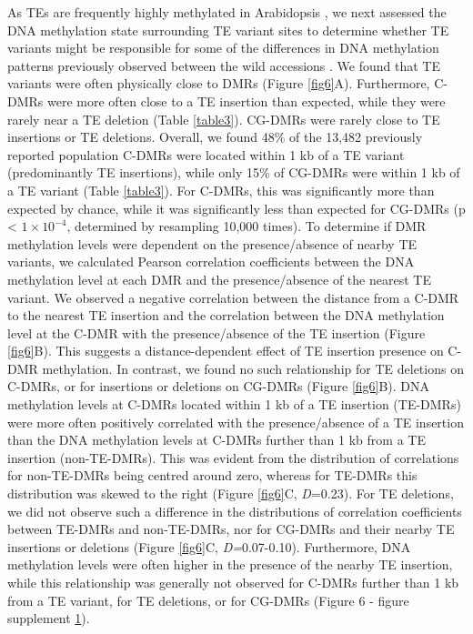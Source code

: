 \documentclass[12pt]{article}
\begin{document}
As TEs are frequently highly methylated in Arabidopsis
\cite{Lister:2008bh, Cokus:2008fc, Zhang:2006eo, Zilberman:2006hx}, we
next assessed the DNA methylation state surrounding TE variant sites to
determine whether TE variants might be responsible for some of the
differences in DNA methylation patterns previously observed between the
wild accessions \cite{Schmitz:2013iu}. We found that TE variants were
often physically close to DMRs (Figure \ref{fig6}A). Furthermore, C-DMRs were
more often close to a TE insertion than expected, while they were rarely
near a TE deletion (Table \ref{table3}). CG-DMRs were rarely close to TE insertions
or TE deletions. Overall, we found 48\% of the 13,482 previously
reported population C-DMRs were located within 1 kb of a TE variant
(predominantly TE insertions), while only 15\% of CG-DMRs were within 1
kb of a TE variant (Table \ref{table3}). For C-DMRs, this was significantly more
than expected by chance, while it was significantly less than expected
for CG-DMRs (p \textless{} $1\times10^{-4}$, determined by resampling 10,000
times). To determine if DMR methylation levels were dependent on the
presence/absence of nearby TE variants, we calculated Pearson
correlation coefficients between the DNA methylation level at each DMR
and the presence/absence of the nearest TE variant. We observed a
negative correlation between the distance from a C-DMR to the nearest TE
insertion and the correlation between the DNA methylation level at the
C-DMR with the presence/absence of the TE insertion (Figure \ref{fig6}B). This
suggests a distance-dependent effect of TE insertion presence on C-DMR
methylation. In contrast, we found no such relationship for TE deletions
on C-DMRs, or for insertions or deletions on CG-DMRs (Figure \ref{fig6}B). DNA
methylation levels at C-DMRs located within 1 kb of a TE insertion
(TE-DMRs) were more often positively correlated with the
presence/absence of a TE insertion than the DNA methylation levels at
C-DMRs further than 1 kb from a TE insertion (non-TE-DMRs). This was
evident from the distribution of correlations for non-TE-DMRs being
centred around zero, whereas for TE-DMRs this distribution was skewed to
the right (Figure \ref{fig6}C, \emph{D}=0.23). For TE deletions, we did not
observe such a difference in the distributions of correlation
coefficients between TE-DMRs and non-TE-DMRs, nor for CG-DMRs and their
nearby TE insertions or deletions (Figure \ref{fig6}C, \emph{D=}0.07-0.10).
Furthermore, DNA methylation levels were often higher in the presence of
the nearby TE insertion, while this relationship was generally not
observed for C-DMRs further than 1 kb from a TE variant, for TE
deletions, or for CG-DMRs (Figure 6 - figure supplement \hyperref[fig6s1]{1}).
\end{document}
